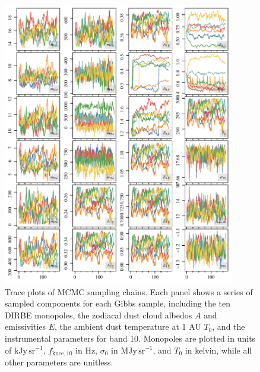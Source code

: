 \documentclass{aa}
\begin{document}
\begin{figure}
    \centering
    \includegraphics[width=0.9\textwidth]{figs/traceplots.pdf}
	\caption{Trace plots of MCMC sampling chains. Each panel shows a series of sampled components for each Gibbs sample, including the ten DIRBE monopoles, the zodiacal dust cloud albedos $A$ and emissivities $E$, the ambient dust temperature at 1 AU $T_0$, and the instrumental parameters for band 10. Monopoles are plotted in units of $\mathrm{kJy\,sr^{-1}}$, $f_\mathrm{knee,10}$ in Hz, $\sigma_0$ in $\mathrm{MJy\,sr^{-1}}$, and $T_0$ in kelvin, while all other parameters are unitless.}
    \label{fig:trace}
\end{figure}
\end{document}
